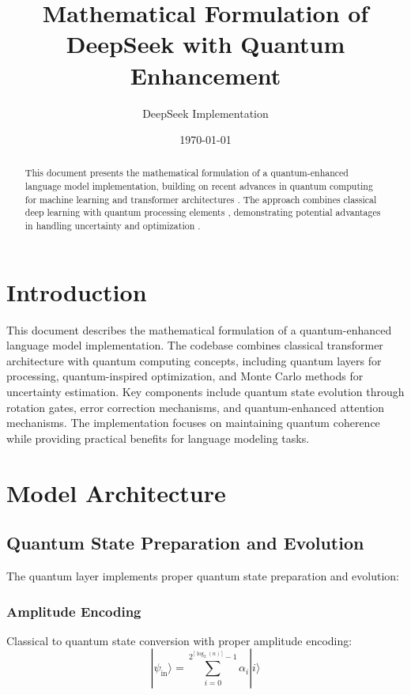 \documentclass{article}
\title{Mathematical Formulation of DeepSeek with Quantum Enhancement}
\author{DeepSeek Implementation}
\date{\today}
\begin{document}
\maketitle

\begin{abstract}
This document presents the mathematical formulation of a quantum-enhanced language model implementation, building on recent advances in quantum computing for machine learning \citep{bharti2022noisy} and transformer architectures \citep{vaswani2017attention}. The approach combines classical deep learning with quantum processing elements \citep{schuld2019quantum}, demonstrating potential advantages in handling uncertainty \citep{gal2016dropout} and optimization \citep{farhi2018classification}.
\end{abstract}

\section*{Introduction}
This document describes the mathematical formulation of a quantum-enhanced language model implementation. The codebase combines classical transformer architecture with quantum computing concepts, including quantum layers for processing, quantum-inspired optimization, and Monte Carlo methods for uncertainty estimation. Key components include quantum state evolution through rotation gates, error correction mechanisms, and quantum-enhanced attention mechanisms. The implementation focuses on maintaining quantum coherence while providing practical benefits for language modeling tasks.

\section{Model Architecture}

\subsection{Quantum State Preparation and Evolution}
The quantum layer implements proper quantum state preparation and evolution:

\subsubsection{Amplitude Encoding}
Classical to quantum state conversion with proper amplitude encoding:
\begin{equation}
|\psi_{\text{in}}\rangle = \sum_{i=0}^{2^{\lceil\log_2(n)\rceil}-1} \alpha_i|i\rangle
\end{equation}
\end{document}
